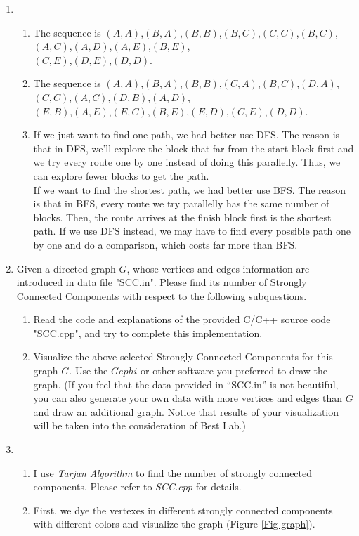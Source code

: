 \documentclass[12pt,a4paper]{article}
\makeatletter
\newtheorem*{solution}{Solution}
\theoremstyle{definition}
\renewenvironment{solution}[1][Solution] {\par\pushQED{\qed}\normalfont\topsep6\p@\@plus6\p@\relax\trivlist\item[\hskip\labelsep\bfseries#1\@addpunct{.}]\ignorespaces}{\popQED\endtrivlist\@endpefalse} \makeatother
\makeatother
\begin{document}
\begin{enumerate}
	\begin{solution}
	~
	\begin{enumerate}
	    \item 
	    The sequence is $(A,A)$,$(B,A)$,$(B,B)$,$(B,C)$,$(C,C)$,$(B,C)$,$(A,C)$,$(A,D)$,$(A,E)$,$(B,E)$,\\$(C,E)$,$(D,E)$,$(D,D)$.
	    \item
	    The sequence is $(A,A)$,$(B,A)$,$(B,B)$,$(C,A)$,$(B,C)$,$(D,A)$,$(C,C)$,$(A,C)$,$(D,B)$,$(A,D)$,\\$(E,B)$,$(A,E)$,$(E,C)$,$(B,E)$,$(E,D)$,$(C,E)$,$(D,D)$.
	    \item
	    If we just want to find one path, we had better use DFS. The reason is that in DFS, we'll explore the block that far from the start block first and we try every route one by one instead of doing this parallelly. Thus, we can explore fewer blocks to get the path.\\
	    If we want to find the shortest path, we had better use BFS. The reason is that in BFS, every route we try parallelly has the same number of blocks. Then, the route arrives at the finish block first is the shortest path. If we use DFS instead, we may have to find every possible path one by one and do a comparison, which costs far more than BFS.
	\end{enumerate}
	\end{solution}
	
	\item Given a directed graph $G$, whose vertices and edges information are introduced in data file "SCC.in". Please find its number of Strongly Connected Components with respect to the following subquestions.
    
    \begin{enumerate}
    	\item Read the code and explanations of the provided C/C++ source code "SCC.cpp", and try to complete this implementation.
    	\item Visualize the above selected Strongly Connected Components for this graph $G$. Use the $Gephi$ or other software you preferred to draw the graph. {\color{blue}(If you feel that the data provided in ``SCC.in'' is not beautiful, you can also generate your own data with more vertices and edges than $G$ and draw an additional graph. Notice that results of your visualization will be taken into the consideration of Best Lab.)}
    \end{enumerate}	
    
    \begin{solution}
    ~
    \begin{enumerate}
        \item
        I use \emph{Tarjan Algorithm} to find the number of strongly connected components. Please refer to \emph{SCC.cpp} for details.
        \item
        First, we dye the vertexes in different strongly connected components with different colors and visualize the graph (Figure \ref{Fig-graph}). 
        

\end{enumerate}
\end{solution}
\end{enumerate}
\end{document}
